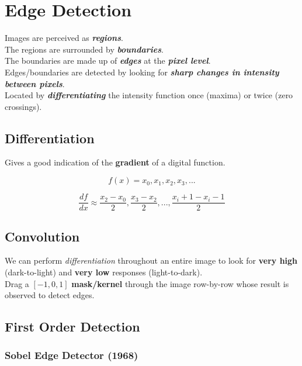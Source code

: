 \documentclass[english, 10pt]{article}
\begin{document}
\section{Edge Detection}\label{edge-detection}

  Images are perceived as \emph{\textbf{regions}}. \\

  The regions are surrounded by \emph{\textbf{boundaries}}. \\

  The boundaries are made up of \emph{\textbf{edges}} at the \textbf{\emph{pixel
  level}}. \\

  Edges/boundaries are detected by looking for \textbf{\emph{sharp
  changes in \emph{intensity} between pixels}}. \\
  
   Located by \textbf{\textit{differentiating}} the intensity function once (maxima) or twice (zero crossings).
  
  \subsection{Differentiation}
  
  Gives a good indication of the \textbf{gradient} of a digital function.
  
  $$ f(x) = x_0, x_1, x_2, x_3, ...$$
  
  $$ \frac{df}{dx} \approx \frac{x_2 - x_0}{2}, \frac{x_3 - x_2}{2}, ..., \frac{x_i+1 - x_i-1}{2}$$
  
\subsection{Convolution}\label{convolution}

  We can perform \textit{differentiation} throughout an entire image to look
  for \textbf{very high} (dark-to-light) and \textbf{very low} responses (light-to-dark).\\

  Drag a $[-1,0,1]$ \textbf{mask/kernel} through the image row-by-row whose result is observed to detect edges.

\subsection{First Order Detection}\label{tools}

\subsubsection{Sobel Edge Detector
(1968)}\label{sobel-edge-detector-1968}
\end{document}
